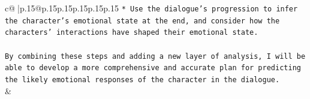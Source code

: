 \documentclass{article}
\begin{document}
{\begin{supertabular}{c@{$\;$}|p{.15\linewidth}@{}p{.15\linewidth}p{.15\linewidth}p{.15\linewidth}p{.15\linewidth}p{.15\linewidth}}
{{{\texttt{* Use the dialogue's progression to infer the character's emotional state at the end, and consider how the characters' interactions have shaped their emotional state.} \\
\\ 
\texttt{By combining these steps and adding a new layer of analysis, I will be able to develop a more comprehensive and accurate plan for predicting the likely emotional responses of the character in the dialogue.} \\
            }
        }
    }
    & \\ \\

\end{supertabular}
}
\end{document}
